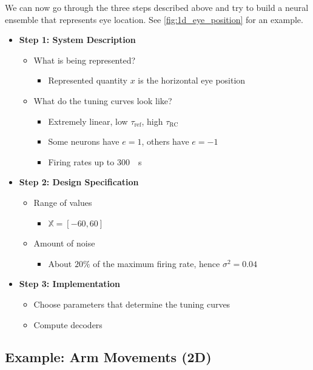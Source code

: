\documentclass[10pt,letterpaper,oneside]{article}
\begin{document}
We can now go through the three steps described above and try to build a neural ensemble that represents eye location. See \cref{fig:1d_eye_position} for an example.
\begin{multicols}{2}
\begin{itemize}
	\item \textbf{Step 1: System Description}
	\begin{itemize}
		\item What is being represented?
		\begin{itemize}
			\item Represented quantity $x$ is the horizontal eye position
		\end{itemize}
		\item What do the tuning curves look like?
		\begin{itemize}
			\item Extremely linear, low $\tau_\mathrm{ref}$, high $\tau_\mathrm{RC}$
			\item Some neurons have $e = 1$, others have $e = -1$
			\item Firing rates up to \SI{300}{\per\second}
		\end{itemize}
	\end{itemize}
	\columnbreak
	\item \textbf{Step 2: Design Specification}
	\begin{itemize}
		\item Range of values
		\begin{itemize}
			\item $\mathbb{X} = [-60, 60]$
		\end{itemize}
		\item Amount of noise
		\begin{itemize}
			\item About $20\%$ of the maximum firing rate, hence $\sigma^2 = 0.04$
		\end{itemize}
	\end{itemize}
	\item \textbf{Step 3: Implementation}
	\begin{itemize}
		\item Choose parameters that determine the tuning curves
		\item Compute decoders
	\end{itemize}
\end{itemize}
\end{multicols}

\subsection{Example: Arm Movements (2D)}
\end{document}
